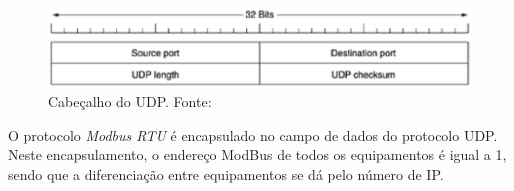     \begin{figure}[!htpb]
        \centering
        \includegraphics[keepaspectratio=true,scale=0.8]{figuras/udp_header.eps}
        \caption{Cabeçalho do UDP. Fonte: \cite{tanenbaum_2002}}
        \label{udp_header}
    \end{figure}

    O protocolo \textit{Modbus RTU} é encapsulado no campo de dados do protocolo UDP. Neste encapsulamento, o endereço ModBus de todos os equipamentos é igual a 1, sendo que a diferenciação entre equipamentos se dá pelo número de IP.